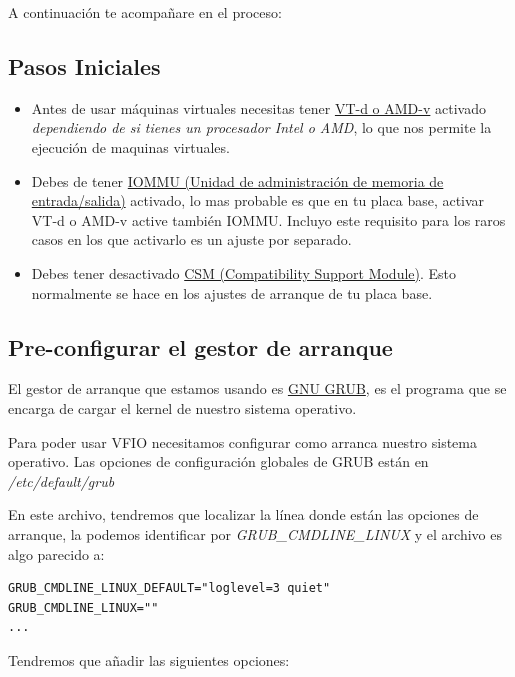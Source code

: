 \documentclass[12pt]{article}
\begin{document}
A continuación te acompañare en el proceso:

\subsection{Pasos Iniciales}

\begin{itemize}
\setlength\itemsep{-0.2em}
\item Antes de usar máquinas virtuales necesitas tener \href{https://en.wikipedia.org/wiki/X86_virtualization#Intel-VT-d}{VT-d o AMD-v} activado \emph{dependiendo de si tienes un procesador Intel o AMD}, lo que nos permite la ejecución de maquinas virtuales.
\item Debes de tener \href{https://en.wikipedia.org/wiki/Input\%E2\%80\%93output_memory_management_unit}{IOMMU (Unidad de administración de memoria de entrada/salida)} activado, lo mas probable es que en tu placa base, activar VT-d o AMD-v active también IOMMU. Incluyo este requisito para los raros casos en los que activarlo es un ajuste por separado.
\item Debes tener desactivado \href{https://en.wikipedia.org/wiki/UEFI#CSM_booting}{CSM (Compatibility Support Module)}. Esto normalmente se hace en los ajustes de arranque de tu placa base.
\end{itemize}

\subsection{Pre-configurar el gestor de arranque}

El gestor de arranque que estamos usando es \href{https://es.wikipedia.org/wiki/GNU_GRUB}{GNU GRUB}, es el programa que se encarga de cargar el kernel de nuestro sistema operativo.

Para poder usar VFIO necesitamos configurar como arranca nuestro sistema operativo. Las opciones de configuración globales de GRUB están en \emph{/etc/default/grub}

En este archivo, tendremos que localizar la línea donde están las opciones de arranque, la podemos identificar por \emph{GRUB\_CMDLINE\_LINUX} y el archivo es algo parecido a:

\begin{verbatim}
GRUB_CMDLINE_LINUX_DEFAULT="loglevel=3 quiet"
GRUB_CMDLINE_LINUX=""
...
\end{verbatim}

Tendremos que añadir las siguientes opciones:
\end{document}

